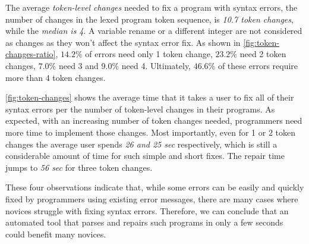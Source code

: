 %
The average \emph{token-level changes} needed to fix a program with syntax
errors, \ie the number of changes in the lexed program token sequence, is
\emph{10.7 token changes}, while the \emph{median is 4}.
%
A variable rename or a different integer are not considered as changes
as they won't affect the syntax error fix.
%
As shown in \autoref{fig:token-changes-ratio}, $14.2\%$ of errors
need only 1 token change, $23.2\%$ need 2 token changes, $7.0\%$
need 3 and $9.0\%$ need 4.
Ultimately, $46.6\%$ of these errors require more than 4 token changes.
%

%
\autoref{fig:token-changes} shows the average time that it takes a user to fix
all of their syntax errors per the number of token-level changes in their
programs. As expected, with an increasing number of token changes needed,
programmers need more time to implement those changes. Most importantly, even
for 1 or 2 token changes the average user spends \emph{26 and 25 sec}
respectively, which is still a considerable amount of time for such simple and
short fixes. The repair time jumps to \emph{56 sec} for three token changes.

\smallskip
These four observations indicate that, while some errors can be
easily and quickly fixed by programmers using existing error messages,
there are many cases where novices struggle with fixing syntax errors.
%
Therefore, we can conclude that an automated tool that parses and repairs
such programs in only a few seconds could benefit many novices.
